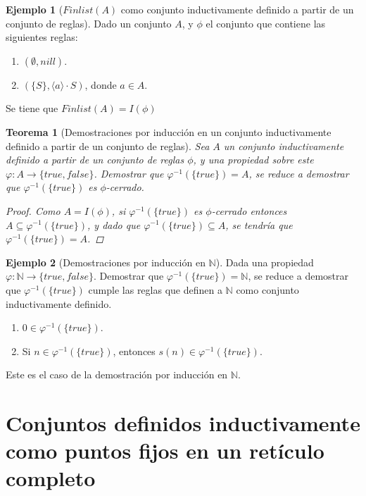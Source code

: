 \documentclass[11pt,oneside]{report}
\theoremstyle{plain}
\newtheorem{teo}{Teorema}[chapter]
\theoremstyle{definition}
\newtheorem{ejemplo}{Ejemplo}[chapter]
\newcommand{\N}{\mathbb{N}}
\begin{document}
\begin{ejemplo}[$Finlist(A)$ como conjunto inductivamente definido a partir de un conjunto de reglas]
    Dado un conjunto $A$, y $\phi$ el conjunto que contiene las siguientes reglas:
    \begin{enumerate}
        \item $(\emptyset, nill)$.
        \item $(\{S\},\langle a \rangle\cdot S)$, donde $a \in A$.
    \end{enumerate}
    Se tiene que $Finlist(A) = I(\phi)$
\end{ejemplo}

\begin{teo}
    [Demostraciones por inducción en un conjunto inductivamente definido a partir de un conjunto de reglas]
    Sea $A$ un conjunto inductivamente definido a partir de un conjunto de reglas $\phi$, y una propiedad sobre este $\varphi : A \rightarrow \{true, false\}$. Demostrar que $\varphi^{-1}(\{true\}) = A$, se reduce a demostrar que $\varphi^{-1}(\{true\})$ es $\phi$-cerrado.
    \begin{proof}
        Como $A = I(\phi)$, si $\varphi^{-1}(\{true\})$ es $\phi$-cerrado entonces $A \subseteq \varphi^{-1}(\{true\})$, y dado que $\varphi^{-1}(\{true\})\subseteq A$, se tendría que $\varphi^{-1}(\{true\}) = A$.
    \end{proof}
\end{teo}

\begin{ejemplo}[Demostraciones por inducción en $\N$]
    Dada una propiedad $\varphi : \N \rightarrow \{true, false\}$. Demostrar que $\varphi^{-1}(\{true\}) = \N$, se reduce a demostrar que $\varphi^{-1}(\{true\})$ cumple las reglas que definen a $\N$ como conjunto inductivamente definido.
    \begin{enumerate}
        \item $0 \in \varphi^{-1}(\{true\})$.
        \item Si $n \in \varphi^{-1}(\{true\})$, entonces $s(n )\in \varphi^{-1}(\{true\})$.
    \end{enumerate}
    Este es el caso de la demostración por inducción en $\N$.
\end{ejemplo}

\section{Conjuntos definidos inductivamente como puntos fijos en un retículo completo}
\end{document}
